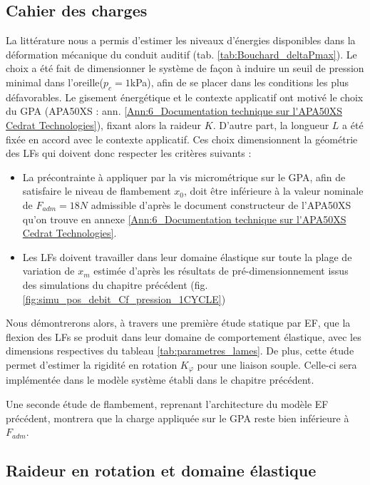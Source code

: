 	\subsection{Cahier des charges}
	\label{subsec:3.1.3:Cahier des charges lames flambees}	
La littérature nous a permis d'estimer les niveaux d'énergies disponibles dans la déformation mécanique du conduit auditif (tab. \ref{tab:Bouchard_deltaPmax}). Le choix a été fait de dimensionner le système de façon à induire un seuil de pression minimal dans l'oreille($p_c=1$kPa), afin de se placer dans les conditions les plus défavorables. Le gisement énergétique et le contexte applicatif ont motivé le choix du GPA (APA50XS : ann. \ref{Ann:6_Documentation technique sur l'APA50XS Cedrat Technologies}), fixant alors la raideur $K$. D'autre part, la longueur $L$ a été fixée en accord avec le contexte applicatif. Ces choix dimensionnent la géométrie des LFs qui doivent donc respecter les critères suivants :
\begin{itemize}[label=$\circ$]
	\item La précontrainte à appliquer par la vis micrométrique sur le GPA, afin de satisfaire le niveau de flambement $x_0$, doit être inférieure à la valeur nominale de $F_{adm}=18N$ admissible d'après le document constructeur de l'APA50XS qu'on trouve en annexe \ref{Ann:6_Documentation technique sur l'APA50XS Cedrat Technologies}.
	\item Les LFs doivent travailler dans leur domaine élastique sur toute la plage de variation de $x_m$ estimée d'après les résultats de pré-dimensionnement issus des simulations du chapitre précédent (fig. \ref{fig:simu_pos_debit_Cf_pression_1CYCLE})
\end{itemize}

Nous démontrerons alors, à travers une première étude statique par EF, que la flexion des LFs se produit dans leur domaine de comportement élastique, avec les dimensions respectives du tableau \ref{tab:parametres_lames}. De plus, cette étude permet d'estimer la rigidité en rotation $K_{\varphi}$ pour une liaison souple. Celle-ci sera implémentée dans le modèle système établi dans le chapitre précédent.
 
Une seconde étude de flambement, reprenant l'architecture du modèle EF précédent, montrera que la charge appliquée sur le GPA reste bien inférieure à $F_{adm}$.
 
	\subsection{Raideur en rotation et domaine élastique} 

